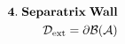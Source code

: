 \documentclass[preview]{standalone}
\begin{document}
\begin{align*}
\special{dvisvgm:raw <g id='unique000'>}\mathbf{4.\;Separatrix\;Wall}\\\mathcal{D}_{\text{ext}}=\partial\mathcal{B}(\mathcal{A})\special{dvisvgm:raw </g>}
\end{align*}
\end{document}
